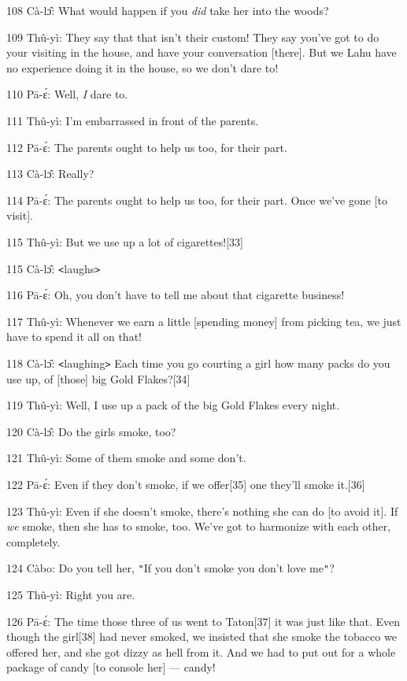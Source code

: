 {108 Cà-lɔ̂: What would happen if you }{\textit{did}}{
take her into the woods?}

{109 Thû-yì: They say that that isn't their custom! They say you've got
to do your visiting in the house, and have your conversation [there]. But we Lahu
have no experience doing it in the house, so we don't dare to! }

{110 Pā-ɛ́: Well,}{\textit{ I}}{ dare to.}

{111 Thû-yì: I'm embarrassed in front of the parents. }

{112 Pā-ɛ́: The parents ought to help us too, for their part.}

{113 Cà-lɔ̂: Really?}

{114 Pā-ɛ́: The parents ought to help us too, for their part. Once we've
gone [to visit].}

{115 Thû-yì: But we use up a lot of cigarettes![33]}

{115 Cà-lɔ̂: \texttt{<}laughs\texttt{>}}

{116 Pā-ɛ́: Oh, you don't have to tell me about that cigarette business!}

{117 Thû-yì: Whenever we earn a little [spending money] from picking tea,
we just have to spend it all on that!}

{118 Cà-lɔ̂: \texttt{<}laughing\texttt{>} Each time you go courting a
girl how many packs do you use up, of [those] big Gold Flakes?[34]}

{119 Thû-yì: Well, I use up a pack of the big Gold Flakes every night.}

{120 Cà-lɔ̂: Do the girls smoke, too?}

{121 Thû-yì: Some of them smoke and some don't.}

{122 Pā-ɛ́: Even if they don't smoke, if we offer[35] one they'll smoke
it.[36]}

{123 Thû-yì: Even if she doesn't smoke, there's nothing she can do [to
avoid it]. If }{\textit{we}}{ smoke, then she has to smoke, too.
We've got to harmonize with each other, completely. }

{124 Càbo: Do you tell her, \texttt{"}If you don't smoke you don't love
me\texttt{"}?}

{125 Thû-yì: Right you are.}

{126 Pā-ɛ́: The time those three of us went to Taton[37] it was just
like that. Even though the girl[38] had never smoked, we insisted that she smoke
the tobacco we offered her, and she got dizzy as hell from it. And we had to put
out for a whole package of candy [to console her] --- candy!}


